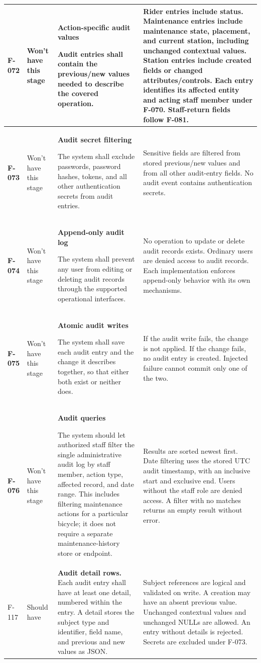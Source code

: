 \documentclass[10pt,a4paper,landscape]{article}
\newcommand{\reqtitle}[1]{{\fontsize{11}{13}\selectfont\bfseries #1}\par\nobreak\vspace{2pt}\noindent}
\begin{document}
\begin{longtable}{|C{27mm}|C{25mm}|L{79mm}|L{111mm}|}
\textbf{F-072} & Won't have this stage & \reqtitle{Action-specific audit values}Audit entries shall contain the previous/new values needed to describe the covered operation. & Rider entries include status. Maintenance entries include maintenance state, placement, and current station, including unchanged contextual values. Station entries include created fields or changed attributes/controls. Each entry identifies its affected entity and acting staff member under F-070. Staff-return fields follow F-081. \\\hline

\textbf{F-073} & Won't have this stage & \reqtitle{Audit secret filtering}The system shall exclude passwords, password hashes, tokens, and all other authentication secrets from audit entries. & Sensitive fields are filtered from stored previous/new values and from all other audit-entry fields. No audit event contains authentication secrets. \\\hline

\textbf{F-074} & Won't have this stage & \reqtitle{Append-only audit log}The system shall prevent any user from editing or deleting audit records through the supported operational interfaces. & No operation to update or delete audit records exists. Ordinary users are denied access to audit records. Each implementation enforces append-only behavior with its own mechanisms. \\\hline

\textbf{F-075} & Won't have this stage & \reqtitle{Atomic audit writes}The system shall save each audit entry and the change it describes together, so that either both exist or neither does. & If the audit write fails, the change is not applied. If the change fails, no audit entry is created. Injected failure cannot commit only one of the two. \\\hline

\textbf{F-076} & Won't have this stage & \reqtitle{Audit queries}The system should let authorized staff filter the single administrative audit log by staff member, action type, affected record, and date range. This includes filtering maintenance actions for a particular bicycle; it does not require a separate maintenance-history store or endpoint. & Results are sorted newest first. Date filtering uses the stored UTC audit timestamp, with an inclusive start and exclusive end. Users without the staff role are denied access. A filter with no matches returns an empty result without error. \\\hline

F-117 & Should have & \textbf{Audit detail rows.} Each audit entry shall have at least one detail, numbered within the entry. A detail stores the subject type and identifier, field name, and previous and new values as JSON. & Subject references are logical and validated on write. A creation may have an absent previous value. Unchanged contextual values and unchanged NULLs are allowed. An entry without details is rejected. Secrets are excluded under F-073. \\ \hline

\end{longtable}
\endgroup
\end{document}
